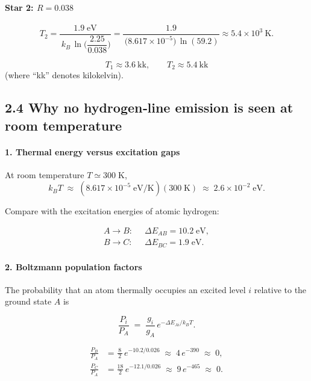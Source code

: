 \documentclass[12pt]{article}
\theoremstyle{definition} %
\theoremstyle{plain} %
\begin{document}
\paragraph{Star 2: \(R = 0.038\)}

\[
  T_2
  = \frac{1.9\;\text{eV}}
         {\,k_B\,\ln\!\bigl(\dfrac{2.25}{0.038}\bigr)}
  = \frac{1.9}
         {\,\bigl(8.617\times10^{-5}\bigr)\,
            \ln(59.2)}
  \approx \boxed{5.4\times10^{3}\ \text{K}}.
\]

\[
  \boxed{T_1 \approx 3.6\ \text{kk}, \qquad T_2 \approx 5.4\ \text{kk}}
\]
(where “kk” denotes kilokelvin).
\subsection*{2.4  Why no hydrogen‐line emission is seen at room temperature}

\paragraph{1.  Thermal energy versus excitation gaps}

At room temperature \(T\simeq 300\;\text{K}\),
\[
  k_B T \;\approx\; (8.617\times10^{-5}\;\text{eV/K})(300\;\text{K})
  \;\approx\; 2.6\times10^{-2}\;\text{eV}.
\]

Compare with the excitation energies of atomic hydrogen:

\[
  \begin{aligned}
    A\!\to\!B: \;&\; \Delta E_{AB}=10.2\;\text{eV}, \\[4pt]
    B\!\to\!C: \;&\; \Delta E_{BC}= 1.9\;\text{eV}.
  \end{aligned}
\]

\paragraph{2.  Boltzmann population factors}

The probability that an atom thermally occupies an excited level \(i\)
relative to the ground state \(A\) is

\[
  \frac{P_i}{P_A} \;=\;
  \frac{g_i}{g_A}\,
  e^{-\Delta E_{Ai}/k_B T}.
\]

\[
  \begin{aligned}
    \frac{P_B}{P_A}
    &=
    \frac{\,8\,}{2}\,
    e^{-10.2/0.026}
    \;\approx\;
    4\,e^{-390}
    \;\approx\;
    0, \\[6pt]
    \frac{P_C}{P_A}
    &=
    \frac{18}{2}\,
    e^{-12.1/0.026}
    \;\approx\;
    9\,e^{-465}
    \;\approx\;
    0.
  \end{aligned}
\]
\end{document}

